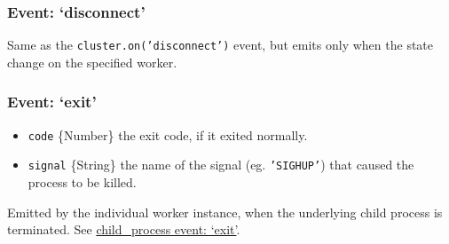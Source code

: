 \subsubsection{Event: `disconnect'}

Same as the \texttt{cluster.on('disconnect')} event, but emits only when
the state change on the specified worker.

\begin{Shaded}
\begin{Highlighting}[]
\NormalTok{(}\NormalTok{, }\NormalTok{() \{}
\NormalTok{\});}
\end{Highlighting}
\end{Shaded}

\subsubsection{Event: `exit'}

\begin{itemize}
\item
  \texttt{code} \{Number\} the exit code, if it exited normally.
\item
  \texttt{signal} \{String\} the name of the signal (eg.
  \texttt{'SIGHUP'}) that caused the process to be killed.
\end{itemize}

Emitted by the individual worker instance, when the underlying child
process is terminated. See
\href{child\_process.html\#child\_process\_event\_exit}{child\_process
event: `exit'}.

\begin{Shaded}
\begin{Highlighting}[]
 \NormalTok{();}
\NormalTok{(}\NormalTok{, }
    \NormalTok{(}
  \NormalTok{\} }  \NormalTok{) \{}
    \NormalTok{(}
  \NormalTok{\} } \NormalTok{\{}
    \NormalTok{(}\NormalTok{);}
  \NormalTok{\}}
\NormalTok{\});}
\end{Highlighting}
\end{Shaded}

